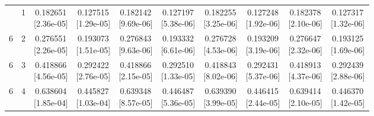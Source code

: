 \documentclass[12pt,letterpaper]{article}
\theoremstyle{plain}
\theoremstyle{definition}
\begin{document}
\begin{table}[p]
\begin{adjustbox}{max width=\linewidth}
\begin{tabular}{@{}rr*{8}{c}@{}}
\addlinespace[2pt]
6 & 1 & \shortstack{0.182651\\[-1pt]{\scriptsize[2.36e-05]}} & \shortstack{0.127515\\[-1pt]{\scriptsize[1.29e-05]}} & \shortstack{0.182142\\[-1pt]{\scriptsize[9.69e-06]}} & \shortstack{0.127197\\[-1pt]{\scriptsize[5.38e-06]}} & \shortstack{0.182255\\[-1pt]{\scriptsize[3.25e-06]}} & \shortstack{0.127248\\[-1pt]{\scriptsize[1.92e-06]}} & \shortstack{0.182378\\[-1pt]{\scriptsize[2.10e-06]}} & \shortstack{0.127317\\[-1pt]{\scriptsize[1.32e-06]}}\\
6 & 2 & \shortstack{0.276551\\[-1pt]{\scriptsize[2.26e-05]}} & \shortstack{0.193073\\[-1pt]{\scriptsize[1.51e-05]}} & \shortstack{0.276843\\[-1pt]{\scriptsize[9.63e-06]}} & \shortstack{0.193332\\[-1pt]{\scriptsize[6.61e-06]}} & \shortstack{0.276728\\[-1pt]{\scriptsize[4.53e-06]}} & \shortstack{0.193209\\[-1pt]{\scriptsize[3.19e-06]}} & \shortstack{0.276647\\[-1pt]{\scriptsize[2.32e-06]}} & \shortstack{0.193125\\[-1pt]{\scriptsize[1.69e-06]}}\\
6 & 3 & \shortstack{0.418866\\[-1pt]{\scriptsize[4.56e-05]}} & \shortstack{0.292422\\[-1pt]{\scriptsize[2.76e-05]}} & \shortstack{0.418866\\[-1pt]{\scriptsize[2.15e-05]}} & \shortstack{0.292510\\[-1pt]{\scriptsize[1.33e-05]}} & \shortstack{0.418843\\[-1pt]{\scriptsize[8.02e-06]}} & \shortstack{0.292431\\[-1pt]{\scriptsize[5.37e-06]}} & \shortstack{0.418913\\[-1pt]{\scriptsize[4.37e-06]}} & \shortstack{0.292439\\[-1pt]{\scriptsize[2.88e-06]}}\\
6 & 4 & \shortstack{0.638604\\[-1pt]{\scriptsize[1.85e-04]}} & \shortstack{0.445827\\[-1pt]{\scriptsize[1.03e-04]}} & \shortstack{0.639348\\[-1pt]{\scriptsize[8.57e-05]}} & \shortstack{0.446487\\[-1pt]{\scriptsize[5.36e-05]}} & \shortstack{0.639390\\[-1pt]{\scriptsize[3.99e-05]}} & \shortstack{0.446415\\[-1pt]{\scriptsize[2.44e-05]}} & \shortstack{0.639414\\[-1pt]{\scriptsize[2.10e-05]}} & \shortstack{0.446370\\[-1pt]{\scriptsize[1.42e-05]}}\\

\end{tabular}
\end{adjustbox}
\end{table}
\end{document}
